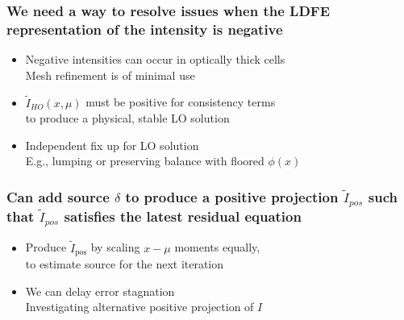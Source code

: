 \documentclass[xcolor=dvipsnames,hyperref={pdfpagelabels=false},unknownkeysallowed]{beamer}
\newcommand{\colb}[1]{{\color{blue} #1}}
\newcommand{\colG}[1]{{\color{Gray!110} #1}}
\newlength{\wideitemsep}
\let\olditem\item
\renewcommand{\item}{\setlength{\itemsep}{\wideitemsep}\olditem}
\newcommand{\B}[1]{\ensuremath{\mathbf{#1}}}
\begin{document}
\begin{frame}
    \frametitle{We need a way to resolve issues when the LDFE representation of the intensity is
        negative}
    {\addtolength\wideitemsep{5pt}
    \begin{itemize}
        \item[] Negative intensities can occur in optically thick cells \\
            \colG{Mesh refinement is of minimal use}
        \item[] $\tilde I_{HO}(x,\mu)$ must be positive for consistency terms \\
            \colG{to produce a physical, stable LO solution}
         \item[] Independent fix up for LO solution
             \colG{\\E.g., lumping or preserving balance with floored $\phi(x)$}
    \end{itemize}
}

\end{frame}

\begin{frame}
    \frametitle{Can add source $\delta$ to produce a positive projection $\tilde I_{pos}$ 
        such that $\tilde I_{pos}$ satisfies the
    latest residual equation}
    {\addtolength\wideitemsep{0.1in}
    \begin{itemize} 
        \item[] Produce $\tilde I_{\text{pos}}$ by scaling $x-\mu$ moments equally,
            \\ \colG{to estimate source for the next iteration\vspace{0.1in}}
        \item[] We can delay error stagnation
            \\ \colG{Investigating alternative positive projection of $I$}
    \end{itemize}
}
\end{frame}
\end{document}
